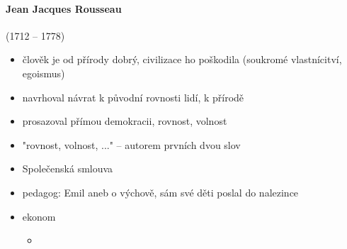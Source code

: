 \paragraph{Jean Jacques Rousseau} (1712 -- 1778)
\begin{itemize}
\item člověk je od přírody dobrý, civilizace ho poškodila  (soukromé vlastnícitví, egoismus)
\item navrhoval návrat k původní rovnosti lidí, k přírodě
\item prosazoval přímou demokracii, rovnost, volnost
\item "rovnost, volnost, ..." -- autorem prvních dvou slov
\item Společenská smlouva
\item pedagog: Emil aneb o výchově, sám své děti poslal do nalezince
\item ekonom
	\begin{itemize}
	\item
	\end{itemize}
\end{itemize}





\timeline

